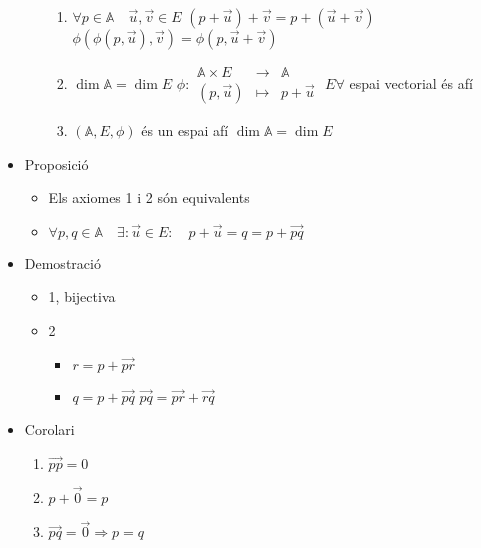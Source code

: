 \documentclass[a4paper,10pt]{article}
\newcommand{\blue}[1]{{\color{blue}#1}}
\newcommand{\A}{\mathbb{A}}
\begin{document}
\begin{itemize}
\begin{itemize}
\begin{enumerate}
		\item $\forall p \in \A \quad \vec{u}, \vec{v} \in E$
			\subitem $(p + \vec{u}) + \vec{v} = p + (\vec{u} + \vec{v})$
			\subitem $\phi (\phi (p, \vec{u}), \vec{v}) = \phi (p, \vec{u} + \vec{v})$
		\item $\dim{\A} = \dim{E}$
			\subitem $\phi: \begin{array}{rcl}\A \times E&\to&\A\\(p,\vec{u})&\mapsto&p+\vec{u}\end{array}$
			\subitem \blue{la suma de} $E \forall$ espai vectorial \blue{és} afí
		\item $(\A, E, \phi)$ \blue{és un} espai afí
			\subitem $\dim{\A} = \dim{E}$
		\end{enumerate}
	\end{itemize}
	\item Proposició
		\begin{itemize}
		\item Els axiomes 1 i 2 són equivalents
		\item $\forall p, q \in \A\quad \exists: \vec{u} \in E:\quad p + \vec{u} = q = p + \overrightarrow{pq}$
		\end{itemize}
	\item Demostració
		\begin{itemize}
		\item 1, bijectiva
		\item 2
			\begin{itemize}
			\item $r = p + \overrightarrow{pr}$
			\item $q = p + \overrightarrow{pq}$
				\subitem $\overrightarrow{pq} = \overrightarrow{pr} + \overrightarrow{rq}$
			\end{itemize}
		\end{itemize}
	\item Corolari
		\begin{enumerate}
		\item $\overrightarrow{pp} = 0$
		\item $p + \vec{0} = p$
		\item $\overrightarrow{pq} = \vec{0} \Rightarrow p = q$
		\end{enumerate}
\end{itemize}
\end{document}

